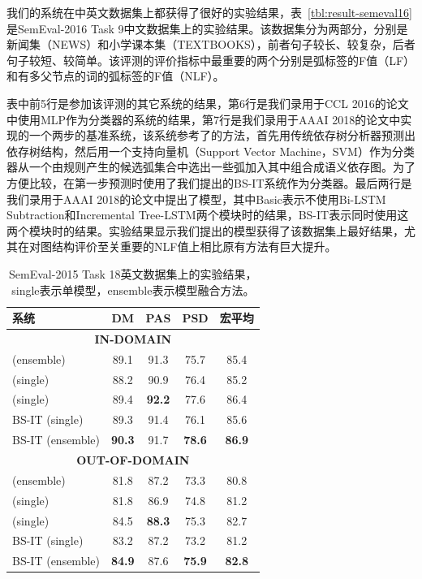 我们的系统在中英文数据集上都获得了很好的实验结果，表~\ref{tbl:result-semeval16}是SemEval-2016 Task 9中文数据集上的实验结果。该数据集分为两部分，分别是新闻集（NEWS）和小学课本集（TEXTBOOKS），前者句子较长、较复杂，后者句子较短、较简单。该评测的评价指标中最重要的两个分别是弧标签的F值（LF）和有多父节点的词的弧标签的F值（NLF）。

表中前5行是参加该评测的其它系统的结果，第6行是我们录用于CCL 2016的论文中使用MLP作为分类器的系统的结果，第7行是我们录用于AAAI 2018的论文中实现的一个两步的基准系统，该系统参考了的方法，首先用传统依存树分析器预测出依存树结构，然后用一个支持向量机（Support Vector Machine，SVM）作为分类器从一个由规则产生的候选弧集合中选出一些弧加入其中组合成语义依存图。为了方便比较，在第一步预测时使用了我们提出的BS-IT系统作为分类器。最后两行是我们录用于AAAI 2018的论文中提出了模型，其中Basic表示不使用Bi-LSTM Subtraction和Incremental Tree-LSTM两个模块时的结果，BS-IT表示同时使用这两个模块时的结果。实验结果显示我们提出的模型获得了该数据集上最好结果，尤其在对图结构评价至关重要的NLF值上相比原有方法有巨大提升。

\begin{table}
	\centering
	\begin{tabular}{l||ccc|c}
		\hline
		\bf 系统&\bf DM&\bf PAS&\bf PSD &\bf 宏平均\\
		\hline
		\multicolumn{5}{c}{\bf IN-DOMAIN}\\
		\hline
		\citeayu{du-EtAl:2015:SemEval} (ensemble) &89.1&91.3&75.7&85.4\\
		\citeayu{almeida-martins:2015:SemEval} (single) &88.2&90.9&76.4&85.2\\
		\citeayu{peng-thomson-smith:2017:Long} (single) &89.4&\bf 92.2&77.6&86.4\\
		\hline
		BS-IT (single) &89.3&91.4&76.1&85.6\\
		BS-IT (ensemble) &\bf 90.3& 91.7&\bf 78.6&\bf 86.9\\
		\hline
		\multicolumn{5}{c}{\bf OUT-OF-DOMAIN}\\
		\hline
		\citeayu{du-EtAl:2015:SemEval} (ensemble) &81.8&87.2&73.3&80.8\\
		\citeayu{almeida-martins:2015:SemEval} (single) &81.8&86.9&74.8&81.2\\
		\citeayu{peng-thomson-smith:2017:Long} (single) &84.5&\bf 88.3&75.3&82.7\\
		\hline
		BS-IT  (single) &83.2&87.2&73.2&81.2\\
		BS-IT (ensemble) &\bf 84.9&87.6&\bf 75.9&\bf 82.8\\
		\hline
	\end{tabular}
	\caption{SemEval-2015 Task 18英文数据集上的实验结果，single表示单模型，ensemble表示模型融合方法。}
	\label{tbl:result-semeval15}
\end{table}

